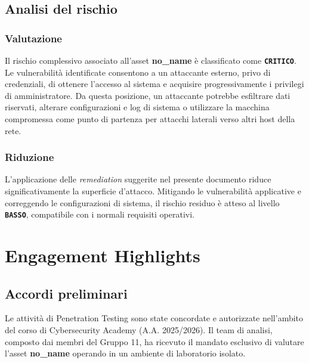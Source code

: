 \documentclass[11pt]{report}
\begin{document}
	\section{Analisi del rischio}
	
	\subsection{Valutazione}
	\begin{tcolorbox}[colback=sevCritico!5, colframe=sevCritico, arc=3pt, boxrule=1pt, title=\textbf{Rischio Attuale}]
		Il rischio complessivo associato all'asset \textbf{no\_name} è classificato come \textbf{\texttt{CRITICO}}. Le vulnerabilità identificate consentono a un attaccante esterno, privo di credenziali, di ottenere l'accesso al sistema e acquisire progressivamente i privilegi di amministratore. Da questa posizione, un attaccante potrebbe esfiltrare dati riservati, alterare configurazioni e log di sistema o utilizzare la macchina compromessa come punto di partenza per attacchi laterali verso altri host della rete.
	\end{tcolorbox}
	
	\subsection{Riduzione}
	\begin{tcolorbox}[colback=sevBasso!5, colframe=sevBasso, arc=3pt, boxrule=1pt, title=\textbf{Rischio Residuo Atteso}]
		L'applicazione delle \textit{remediation} suggerite nel presente documento riduce significativamente la superficie d'attacco. Mitigando le vulnerabilità applicative e correggendo le configurazioni di sistema, il rischio residuo è atteso al livello \textbf{\texttt{BASSO}}, compatibile con i normali requisiti operativi.
	\end{tcolorbox}
	
	\chapter{Engagement Highlights}
	
	\section{Accordi preliminari}
	Le attività di Penetration Testing sono state concordate e autorizzate nell'ambito del corso di Cybersecurity Academy (A.A. 2025/2026). Il team di analisi, composto dai membri del Gruppo 11, ha ricevuto il mandato esclusivo di valutare l'asset \textbf{no\_name} operando in un ambiente di laboratorio isolato.
	
\end{document}
